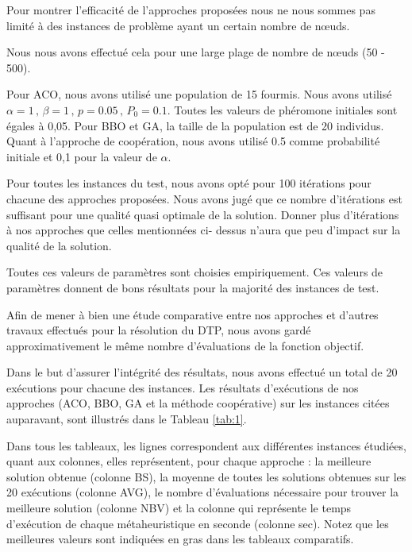 Pour montrer l'efficacité de l'approches proposées nous ne nous sommes pas limité à des instances de problème ayant un certain nombre de nœuds.

Nous nous avons effectué cela pour une large plage de nombre de nœuds (50 - 500).

Pour ACO, nous avons utilisé une population de 15 fourmis. Nous avons utilisé $\alpha = 1 \, , \, \beta = 1 \, , \, p = 0.05 \, , \, P_0 = 0.1 $. Toutes les valeurs de phéromone initiales sont égales à 0,05. Pour BBO et GA, la taille de la population est de 20 individus. Quant à l’approche de coopération,  nous avons utilisé 0.5 comme probabilité initiale et 0,1 pour la valeur de  \( \alpha \).

Pour toutes les instances du test, nous avons opté pour 100 itérations pour chacune des approches proposées. Nous avons jugé que ce nombre d'itérations est suffisant pour une qualité quasi optimale de la solution. Donner plus d'itérations à nos approches que celles mentionnées ci- dessus n'aura que peu d'impact sur la qualité de la solution. 

Toutes ces valeurs de paramètres sont choisies empiriquement. Ces valeurs de paramètres donnent de bons résultats pour la majorité des instances de test.

Afin de mener à bien une étude comparative entre nos approches et d’autres travaux effectués pour la résolution du DTP, nous avons gardé approximativement le même nombre d’évaluations de la fonction objectif.

Dans le but d’assurer l’intégrité des résultats, nous avons effectué un total de 20 exécutions pour chacune des instances. Les résultats d’exécutions de nos approches (ACO, BBO, GA et la méthode coopérative) sur les instances citées auparavant, sont illustrés dans le Tableau \ref{tab:1}.

Dans tous les tableaux, les lignes correspondent aux différentes instances étudiées, quant aux colonnes, elles représentent, pour chaque approche : la meilleure solution obtenue (colonne BS), la moyenne de toutes les solutions obtenues sur les 20 exécutions (colonne AVG), le nombre d’évaluations nécessaire pour trouver la meilleure solution (colonne NBV) et la colonne qui représente le temps d’exécution de chaque métaheuristique en seconde (colonne sec). 
Notez que les meilleures valeurs sont indiquées en gras dans les tableaux comparatifs.



